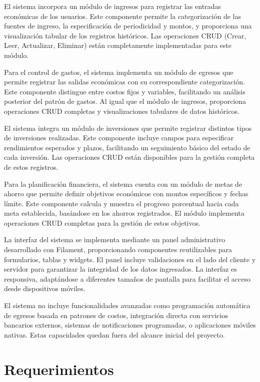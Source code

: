 \documentclass[journal]{IEEEtran}
\begin{document}
El sistema incorpora un módulo de ingresos para registrar las entradas económicas de los usuarios. Este componente permite la categorización de las fuentes de ingreso, la especificación de periodicidad y montos, y proporciona una visualización tabular de los registros históricos. Las operaciones CRUD (Crear, Leer, Actualizar, Eliminar) están completamente implementadas para este módulo.

Para el control de gastos, el sistema implementa un módulo de egresos que permite registrar las salidas económicas con su correspondiente categorización. Este componente distingue entre costos fijos y variables, facilitando un análisis posterior del patrón de gastos. Al igual que el módulo de ingresos, proporciona operaciones CRUD completas y visualizaciones tabulares de datos históricos.

El sistema integra un módulo de inversiones que permite registrar distintos tipos de inversiones realizadas. Este componente incluye campos para especificar rendimientos esperados y plazos, facilitando un seguimiento básico del estado de cada inversión. Las operaciones CRUD están disponibles para la gestión completa de estos registros.

Para la planificación financiera, el sistema cuenta con un módulo de metas de ahorro que permite definir objetivos económicos con montos específicos y fechas límite. Este componente calcula y muestra el progreso porcentual hacia cada meta establecida, basándose en los ahorros registrados. El módulo implementa operaciones CRUD completas para la gestión de estos objetivos.

La interfaz del sistema se implementa mediante un panel administrativo desarrollado con Filament, proporcionando componentes reutilizables para formularios, tablas y widgets. El panel incluye validaciones en el lado del cliente y servidor para garantizar la integridad de los datos ingresados. La interfaz es responsiva, adaptándose a diferentes tamaños de pantalla para facilitar el acceso desde dispositivos móviles.

El sistema no incluye funcionalidades avanzadas como programación automática de egresos basada en patrones de costos, integración directa con servicios bancarios externos, sistemas de notificaciones programadas, o aplicaciones móviles nativas. Estas capacidades quedan fuera del alcance inicial del proyecto.

\section{Requerimientos}
\end{document}
